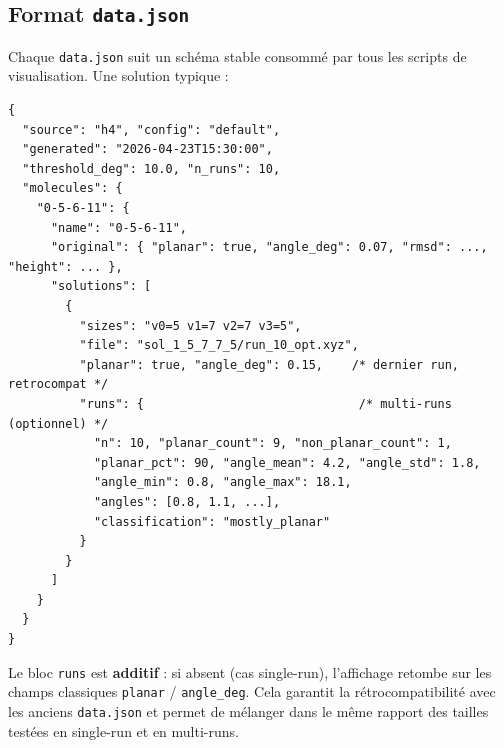 \subsection{Format \texttt{data.json}}

Chaque \texttt{data.json} suit un schéma stable consommé par tous les scripts de
visualisation. Une solution typique :

\begin{lstlisting}[style=benzai]
{
  "source": "h4", "config": "default",
  "generated": "2026-04-23T15:30:00",
  "threshold_deg": 10.0, "n_runs": 10,
  "molecules": {
    "0-5-6-11": {
      "name": "0-5-6-11",
      "original": { "planar": true, "angle_deg": 0.07, "rmsd": ..., "height": ... },
      "solutions": [
        {
          "sizes": "v0=5 v1=7 v2=7 v3=5",
          "file": "sol_1_5_7_7_5/run_10_opt.xyz",
          "planar": true, "angle_deg": 0.15,    /* dernier run, retrocompat */
          "runs": {                              /* multi-runs (optionnel) */
            "n": 10, "planar_count": 9, "non_planar_count": 1,
            "planar_pct": 90, "angle_mean": 4.2, "angle_std": 1.8,
            "angle_min": 0.8, "angle_max": 18.1,
            "angles": [0.8, 1.1, ...],
            "classification": "mostly_planar"
          }
        }
      ]
    }
  }
}
\end{lstlisting}

\begin{remarque}
  Le bloc \texttt{runs} est \textbf{additif} : si absent (cas single-run), l'affichage
  retombe sur les champs classiques \texttt{planar} / \texttt{angle\_deg}. Cela garantit la
  rétrocompatibilité avec les anciens \texttt{data.json} et permet de mélanger dans le même
  rapport des tailles testées en single-run et en multi-runs.
\end{remarque}

